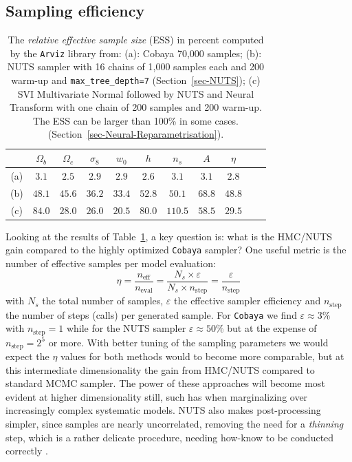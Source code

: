 \documentclass[twocolumn,twocolappendix,nofootinbib,iop]{openjournal}
\begin{document}
\subsection{Sampling efficiency}
\label{sec-results}
\begin{table}[htb]
\caption{The \textit{relative effective sample size} (ESS) in percent computed by the \texttt{Arviz} library \citep{arviz_2019} from: 
(a): Cobaya 70,000 samples;
(b): NUTS sampler with 16 chains of 1,000 samples each and 200 warm-up and \texttt{max\_tree\_depth=7} (Section~\ref{sec-NUTS}); 
(c) SVI Multivariate Normal followed by NUTS and Neural Transform  with one chain of 200 samples and 200 warm-up. The ESS can be larger than 100\% in some cases.  (Section~\ref{sec-Neural-Reparametrisation}).}
\label{tab-ESS-NUTS_SVI-1}
 \centering
\begin{tabular}{ccccccccccc}
\hline
    & $\Omega_b$ & $\Omega_c$ & $\sigma_8$ & $w_0$ & $h$ & $n_s$ & $A$ & $\eta$\\
\hline
(a) &  $3.1$ & $2.5$       & $2.9$      & $2.9$  & $2.6$  & $3.1$  & $3.1$ & $2.8$ \\  
(b) & $48.1$ &  $45.6$     & $36.2$     & $33.4$ & $52.8$ & $50.1$ & $68.8$ & $48.8$\\
(c) & $84.0$ &  $28.0$     & $26.0$     & $20.5$ & $80.0$ & $110.5$ & $58.5$ & $29.5$\\
\hline
\end{tabular}
\end{table}
%
Looking at the results of Table~\ref{tab-ESS-NUTS_SVI-1}, a key question is: what is the HMC/NUTS gain compared to the highly optimized \texttt{Cobaya} sampler? 
One useful metric is the number of effective samples per model evaluation:
\begin{equation}
    \eta = \frac{n_\mathrm{eff}}{n_\mathrm{eval}} = \frac{N_s \times \varepsilon}{N_s \times n_\mathrm{step}} = \frac{\varepsilon}{n_\mathrm{step}}
\end{equation}
with $N_s$ the total number of samples, $\varepsilon$ the effective sampler efficiency  and $n_\mathrm{step}$ the number of steps (calls) per generated sample. For \texttt{Cobaya} we find $\varepsilon\approx 3\%$ with $n_\mathrm{step}=1$ while for the NUTS sampler $\varepsilon\approx 50\%$ but at the expense of $n_\mathrm{step}=2^5$ or more. With better tuning of the sampling parameters we would expect the $\eta$ values for both methods would to become more comparable, but at this intermediate dimensionality the gain from HMC/NUTS compared to standard MCMC sampler. The power of these approaches will become most evident at higher dimensionality still, such has when marginalizing over increasingly complex systematic models. NUTS also makes post-processing simpler, since samples are nearly uncorrelated, removing the need for a \textit{thinning} step, which is a rather delicate procedure, needing how-know to be conducted correctly \citep{doi:10.1146/annurev-statistics-040220-091727, Owen2017}.
\end{document}

